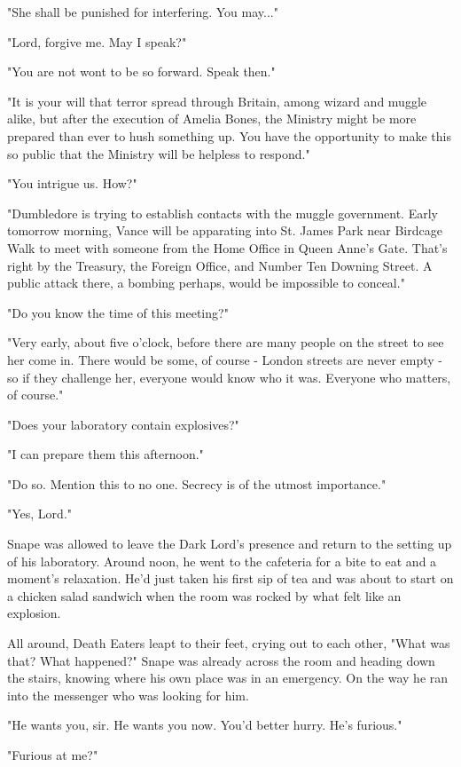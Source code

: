 \documentclass[a4paper,11pt]{article}
\begin{document}
"She shall be punished for interfering. You may..."

"Lord, forgive me. May I speak?"

"You are not wont to be so forward. Speak then."

"It is your will that terror spread through Britain, among wizard and muggle alike, but after the execution of Amelia Bones, the Ministry might be more prepared than ever to hush something up. You have the opportunity to make this so public that the Ministry will be helpless to respond."

"You intrigue us. How?"

"Dumbledore is trying to establish contacts with the muggle government. Early tomorrow morning, Vance will be apparating into St. James Park near Birdcage Walk to meet with someone from the Home Office in Queen Anne's Gate. That's right by the Treasury, the Foreign Office, and Number Ten Downing Street. A public attack there, a bombing perhaps, would be impossible to conceal."

"Do you know the time of this meeting?"

"Very early, about five o'clock, before there are many people on the street to see her come in. There would be some, of course - London streets are never empty - so if they challenge her, everyone would know who it was. Everyone who matters, of course."

"Does your laboratory contain explosives?"

"I can prepare them this afternoon."

"Do so. Mention this to no one. Secrecy is of the utmost importance."

"Yes, Lord."

Snape was allowed to leave the Dark Lord's presence and return to the setting up of his laboratory. Around noon, he went to the cafeteria for a bite to eat and a moment's relaxation. He'd just taken his first sip of tea and was about to start on a chicken salad sandwich when the room was rocked by what felt like an explosion.

All around, Death Eaters leapt to their feet, crying out to each other, "What was that? What happened?" Snape was already across the room and heading down the stairs, knowing where his own place was in an emergency. On the way he ran into the messenger who was looking for him.

"He wants you, sir. He wants you now. You'd better hurry. He's furious."

"Furious at me?"
\end{document}
